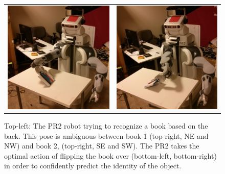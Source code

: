 \begin{figure}[ht]
\begin{tabular}{cccc}
    \multicolumn{2}{c}{\includegraphics[width=0.45\columnwidth]{pics/pr2_grasp.jpg}}
    & \multicolumn{2}{c}{\includegraphics[width=0.45\columnwidth]{pics/pr2_rotate.jpg}}
    \end{tabular}
    \caption{Top-left: The PR2 robot trying to recognize a book based on the back. This pose is ambiguous between book 1 (top-right, NE and NW) and book 2, (top-right, SE and SW). The PR2 takes the optimal action of flipping the book over (bottom-left, bottom-right) in order to confidently predict the identity of the object.}
    \label{fig:pr2}
    \end{figure}

